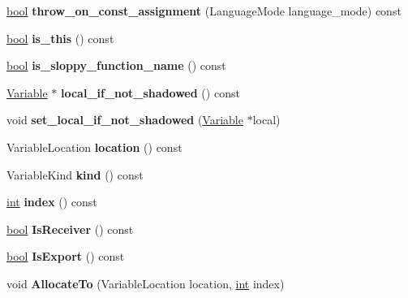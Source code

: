 \begin{DoxyCompactItemize}
\mbox{\label{classv8_1_1internal_1_1Variable_ab82fc4c94e7f1cfb9183b215cc9ca9a5}} 
\mbox{\hyperlink{classbool}{bool}} {\bfseries throw\+\_\+on\+\_\+const\+\_\+assignment} (Language\+Mode language\+\_\+mode) const
\item 
\mbox{\label{classv8_1_1internal_1_1Variable_a3ea5d38859115335c180ece6d25b6af8}} 
\mbox{\hyperlink{classbool}{bool}} {\bfseries is\+\_\+this} () const
\item 
\mbox{\label{classv8_1_1internal_1_1Variable_af61479865c77c4dbb90af55757bf6369}} 
\mbox{\hyperlink{classbool}{bool}} {\bfseries is\+\_\+sloppy\+\_\+function\+\_\+name} () const
\item 
\mbox{\label{classv8_1_1internal_1_1Variable_a785a17670d69a85aff46242fab73b0d9}} 
\mbox{\hyperlink{classv8_1_1internal_1_1Variable}{Variable}} $\ast$ {\bfseries local\+\_\+if\+\_\+not\+\_\+shadowed} () const
\item 
\mbox{\label{classv8_1_1internal_1_1Variable_a89aa95ef6d4226e3ca0c9a862e27e252}} 
void {\bfseries set\+\_\+local\+\_\+if\+\_\+not\+\_\+shadowed} (\mbox{\hyperlink{classv8_1_1internal_1_1Variable}{Variable}} $\ast$local)
\item 
\mbox{\label{classv8_1_1internal_1_1Variable_a837d61fffdd5d094d96829c9a1667567}} 
Variable\+Location {\bfseries location} () const
\item 
\mbox{\label{classv8_1_1internal_1_1Variable_aa0114a62c1919fb3ae1877145342a3eb}} 
Variable\+Kind {\bfseries kind} () const
\item 
\mbox{\label{classv8_1_1internal_1_1Variable_abea4c63c3e936f7160f01f498639ca87}} 
\mbox{\hyperlink{classint}{int}} {\bfseries index} () const
\item 
\mbox{\label{classv8_1_1internal_1_1Variable_a488e13a7c2ef64eca71ca993afefd141}} 
\mbox{\hyperlink{classbool}{bool}} {\bfseries Is\+Receiver} () const
\item 
\mbox{\label{classv8_1_1internal_1_1Variable_ab1b5e20aba72ec0122a81022e1d5e59a}} 
\mbox{\hyperlink{classbool}{bool}} {\bfseries Is\+Export} () const
\item 
\mbox{\label{classv8_1_1internal_1_1Variable_a681c73bd527b5d39181755b8c0221370}} 
void {\bfseries Allocate\+To} (Variable\+Location location, \mbox{\hyperlink{classint}{int}} index)
\end{DoxyCompactItemize}
